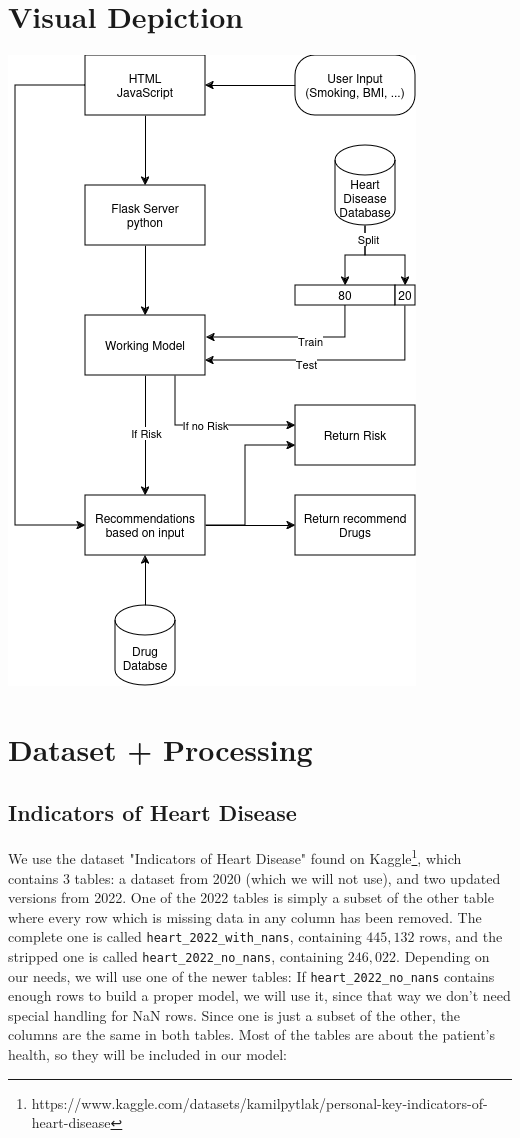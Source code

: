 \documentclass{article}
\begin{document}
\section{Visual Depiction}
\begin{center} 
\includegraphics[scale=.75]{Hearth_death.drawio(1).png}
\end{center}

\section{Dataset + Processing}

\subsection{Indicators of Heart Disease}
We use the dataset "Indicators of Heart Disease" found on Kaggle\footnote{https://www.kaggle.com/datasets/kamilpytlak/personal-key-indicators-of-heart-disease},
which contains 3 tables: a dataset from 2020 (which we will not use),
and two updated versions from 2022.
One of the 2022 tables is simply a subset of the other table where every row which is missing data in any column has been removed.
The complete one is called \texttt{heart\_2022\_with\_nans}, containing $445,132$ rows,
and the stripped one is called \texttt{heart\_2022\_no\_nans}, containing $246,022$.
Depending on our needs, we will use one of the newer tables:
If \texttt{heart\_2022\_no\_nans} contains enough rows to build a proper model,
we will use it, since that way we don't need special handling for NaN rows.
Since one is just a subset of the other, the columns are the same in both tables.
Most of the tables are about the patient's health, so they will be included in our model:
\end{document}
